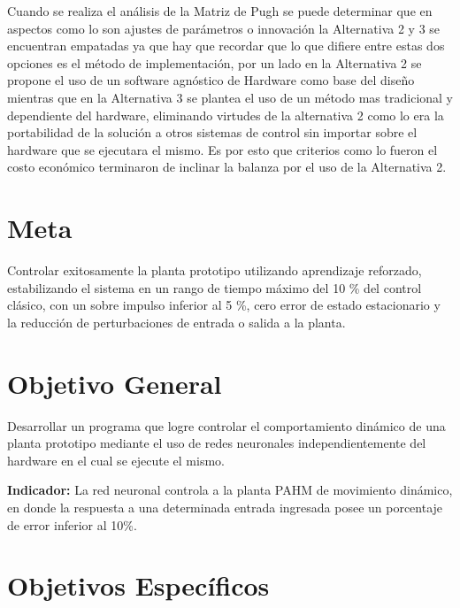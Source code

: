 \documentclass[12pt]{article}
\begin{document}
Cuando se realiza el análisis de la Matriz de Pugh se puede determinar que en aspectos como lo son ajustes de parámetros o innovación la Alternativa 2 y 3 se encuentran empatadas ya que hay que recordar que lo que difiere entre estas dos opciones es el método de implementación, por un lado en la Alternativa 2 se propone el uso de un software agnóstico de Hardware como base del diseño mientras que en la Alternativa 3 se plantea el uso de un método mas tradicional y dependiente del hardware, eliminando virtudes de la alternativa 2 como lo era la portabilidad de la solución a otros sistemas de control sin importar sobre el hardware que se ejecutara el mismo. Es por esto que criterios como lo fueron el costo económico terminaron de inclinar la balanza por el uso de la Alternativa 2. 

\section{Meta}

Controlar exitosamente la planta prototipo utilizando aprendizaje reforzado, estabilizando el sistema en un rango de tiempo máximo del 10 \% del control clásico, con un sobre impulso inferior al 5 \%, cero error de estado estacionario y la reducción de perturbaciones de entrada o salida a la planta.

\section{Objetivo General}

Desarrollar un programa que logre controlar el comportamiento dinámico de una planta prototipo mediante el uso de redes neuronales independientemente del hardware en el cual se ejecute el mismo.

\textbf{Indicador:} La red neuronal controla a la planta PAHM de movimiento dinámico, en donde la respuesta a una determinada entrada ingresada posee un porcentaje de error inferior al 10\%.

\section{Objetivos Específicos}
\end{document}
